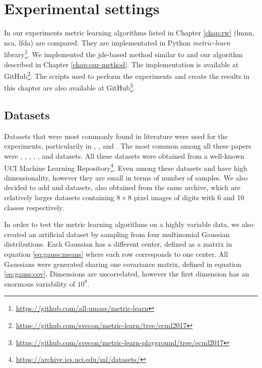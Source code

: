 \documentclass[12pt,a4paper]{report}
\begin{document}
\section{Experimental settings} 
In our experiments metric learning algorithms listed in Chapter \ref{chap:rw} (\ac{lmnn}, \ac{nca}, \ac{lfda}) are compared. They are implementated in Python \textit{metric-learn} library\footnote{\url{https://github.com/all-umass/metric-learn}}. We implemented the \ac{jde}-based method similar to \citep{fukui2013evolutionary} and our algorithm described in Chapter \ref{chap:our-method}. The implementation is available at GitHub\footnote{\url{https://github.com/svecon/metric-learn/tree/ecml2017}}. The scripts used to perform the experiments and create the results in this chapter are also available at GitHub\footnote{\url{https://github.com/svecon/metric-learn-playground/tree/ecml2017}}.

\subsection{Datasets} \label{chap:exp:datasets}
Datasets that were most commonly found in literature were used for the experiments, particularily in \citep{xing2002distance}, \citep{weinberger2009distance}, \citep{jacobgoldberger2004neighbourhood} and \citep{fukui2013evolutionary}. The most common among all these papers were , , , , ,  and  datasets. All these datasets were obtained from a well-known UCI Machine Learning Repository\footnote{\url{https://archive.ics.uci.edu/ml/datasets/}}. Even among these datasets  and  have high dimensionality, however they are small in terms of number of samples. We also decided to add  and  datasets, also obtained from the same archive, which are relatively larger datasets containing $8\times 8$ pixel images of digits with 6 and 10 classes respectively.

In order to test the metric learning algorithms on a highly variable data, we also created an artificial dataset  by sampling from four multinomial Gaussian distributions. Each Gaussian has a different center, defined as a matrix in equation \eqref{eq:gauss:means} where each row corresponds to one center. All Gaussians were generated sharing one covariance matrix, defined in equation \eqref{eq:gauss:cov}. Dimensions are uncorrelated, however the first dimension has an enormous variability of $10^8$.
\end{document}

